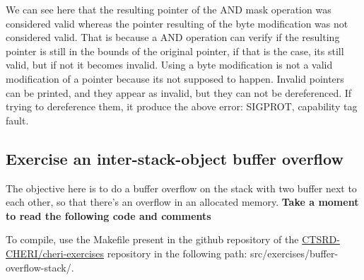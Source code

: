\documentclass[a4paper, 11pt]{article}
\newcommand{\xmark}{\ding{55}}
\begin{document}
We can see here that the resulting pointer of the AND mask operation was considered valid whereas the pointer resulting of the byte modification was not considered valid. That is because a AND operation can verify if the resulting pointer is still in the bounds of the original pointer, if that is the case, its still valid, but if not it becomes invalid. Using a byte modification is not a valid modification of a pointer because its not supposed to happen. 
Invalid pointers can be printed, and they appear as invalid, but they can not be dereferenced. If trying to dereference them, it produce the above error: SIGPROT, capability tag fault.

\subsection{Exercise an inter-stack-object buffer overflow}
	The objective here is to do a buffer overflow on the stack with two buffer next to each other, so that there's an overflow in an allocated memory.
	\textbf{Take a moment to read the following code and comments}
	

	\begin{center}
	\end{center}


To compile, use the Makefile present in the github repository of the \href{https://github.com/CTSRD-CHERI/cheri-exercises}{CTSRD-CHERI/cheri-exercises} repository in the following path: src/exercises/buffer-overflow-stack/. 
\end{document}
